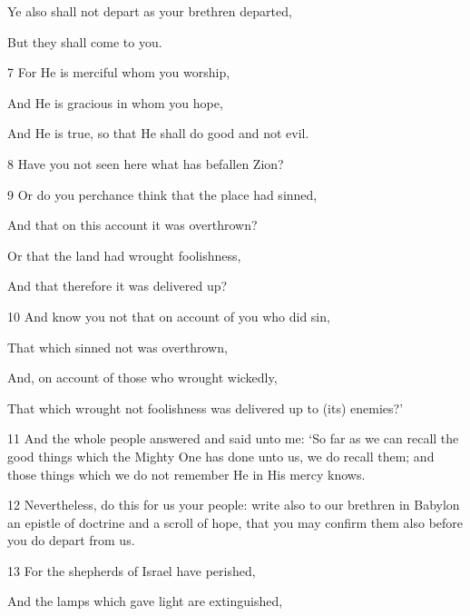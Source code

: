 \par Ye also shall not depart as your brethren departed,

\par But they shall come to you.

\par 7 For He is merciful whom you worship,

\par And He is gracious in whom you hope,

\par And He is true, so that He shall do good and not evil.

\par 8 Have you not seen here what has befallen Zion?

\par 9 Or do you perchance think that the place had sinned,

\par And that on this account it was overthrown?

\par Or that the land had wrought foolishness,

\par And that therefore it was delivered up?

\par 10 And know you not that on account of you who did sin,

\par That which sinned not was overthrown,

\par And, on account of those who wrought wickedly,

\par That which wrought not foolishness was delivered up to (its) enemies?’

\par 11 And the whole people answered and said unto me: ‘So far as we can recall the good things which the Mighty One has done unto us, we do recall them; and those things which we do not remember He in His mercy knows. 

\par 12 Nevertheless, do this for us your people: write also to our brethren in Babylon an epistle of doctrine and a scroll of hope, that you may confirm them also before you do depart from us.

\par 13 For the shepherds of Israel have perished,

\par And the lamps which gave light are extinguished,

